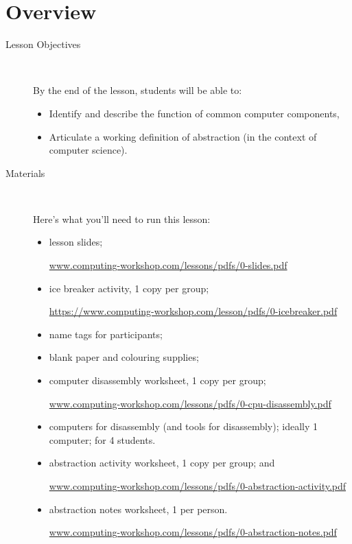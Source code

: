 \documentclass[12pt]{article}
\newcommand{\cwurl}{https://www.computing-workshop.com/lesson/pdfs/}
\begin{document}
\section*{Overview}
\begin{description}
  \item [Lesson Objectives] 
    ~

   By the end of the lesson, students will be able to:
  \begin{itemize}

    \item Identify and describe the function of common computer components,

    \item Articulate a working definition of abstraction (in the context of
      computer science).

  \end{itemize}
  \item [Materials]~

Here's what you'll need to run this lesson:
  \begin{itemize}
    \item
      lesson slides;

      \url{www.computing-workshop.com/lessons/pdfs/0-slides.pdf}

    \item
      ice breaker activity, 1 copy per group; 

      \url{\cwurl 0-icebreaker.pdf}

    \item
      name tags for participants;

    \item
      blank paper and colouring supplies;

    \item
      computer disassembly worksheet, 1 copy per group;

      \url{www.computing-workshop.com/lessons/pdfs/0-cpu-disassembly.pdf}

    \item
      computers for disassembly (and tools for disassembly); ideally 1
      computer;
      for 4 students.

    \item
      abstraction activity worksheet, 1 copy per group; and

      \url{www.computing-workshop.com/lessons/pdfs/0-abstraction-activity.pdf}

    \item
      abstraction notes worksheet, 1 per person.

      \url{www.computing-workshop.com/lessons/pdfs/0-abstraction-notes.pdf}

  \end{itemize}
\end{description}
\end{document}
